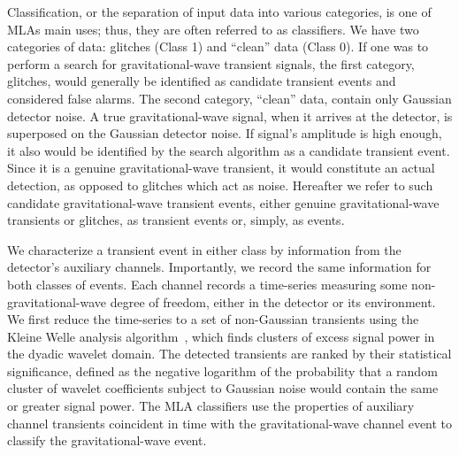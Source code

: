 \documentclass[prd, twocolumn, lengthcheck, superscriptaddress, showpacs, letterpaper, nofootinbib]{revtex4-1}
\begin{document}
Classification, or the separation of input data into various categories, is one of MLAs main uses; thus, they are often referred to as classifiers. We have two categories of data: glitches (Class 1) and ``clean'' data (Class 0). If one was to perform a search for gravitational-wave transient signals, the first category, glitches, would generally be identified as candidate transient events and considered false alarms. The second category, ``clean'' data, contain only Gaussian detector noise. A true gravitational-wave signal, when it arrives at the detector, is superposed on the Gaussian detector noise. If signal's amplitude is high enough, it also would be identified by the search algorithm as a candidate transient event. Since it is a genuine gravitational-wave transient, it would constitute an actual detection, as opposed to glitches which act as noise. Hereafter we refer to such candidate gravitational-wave transient events, either genuine gravitational-wave transients or glitches, as transient events or, simply, as  events. 

We characterize a transient event in either class by information from the detector's auxiliary channels. Importantly, we record the same information for both classes of events. Each channel records a time-series measuring some non-gravitational-wave degree of freedom, either in the detector or its environment. We first reduce the time-series to a set of non-Gaussian transients using the Kleine Welle analysis algorithm~\cite{ref:omegagrams}, which finds clusters of excess signal power in the dyadic wavelet domain. The detected transients are ranked by their statistical significance, defined as the negative logarithm of the probability that a random cluster of wavelet coefficients subject to Gaussian noise would contain the same or greater signal power. The \ac{MLA} classifiers use the properties of auxiliary channel transients coincident in time with the gravitational-wave channel event to classify the gravitational-wave event.
\end{document}
